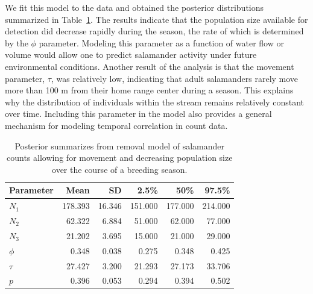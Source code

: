 We fit this model to the data and obtained the posterior distributions
summarized in Table~\ref{unmarked.tab.dusky}. The results indicate that
the population size available for detection did decrease
rapidly during the season, the rate of which is determined by the
$\phi$ parameter. Modeling this parameter as a function of water flow
or volume would allow one to predict salamander activity under future
environmental conditions.
Another result of the analysis is that the movement parameter, $\tau$,
was relatively low, indicating that adult salamanders rarely move more
than 100 m
from their home range center during a season. This explains
why the distribution of individuals within the stream remains
relatively constant over time. Including this parameter in the model
also provides a general mechanism for modeling temporal correlation in
count data.

\begin{table}
  \centering
  \caption{Posterior summarizes from removal model of salamander
    counts allowing for movement and decreasing population size over
    the course of a breeding season.}
  \begin{tabular}{lrrrrr}
    \hline
    Parameter & Mean    & SD     & 2.5\%   & 50\%    & 97.5\%  \\
    \hline
    $N_1$     & 178.393 & 16.346 & 151.000 & 177.000 & 214.000 \\
    $N_2$     & 62.322  & 6.884  & 51.000  & 62.000  & 77.000  \\
    $N_3$     & 21.202  & 3.695  & 15.000  & 21.000  & 29.000  \\
    $\phi$    & 0.348   & 0.038  & 0.275   & 0.348   & 0.425   \\
    $\tau$    & 27.427  & 3.200  & 21.293  & 27.173  & 33.706  \\
    $p$       & 0.396   & 0.053  & 0.294   & 0.394   & 0.502   \\
    \hline
  \end{tabular}
  \label{unmarked.tab.dusky}
\end{table}


